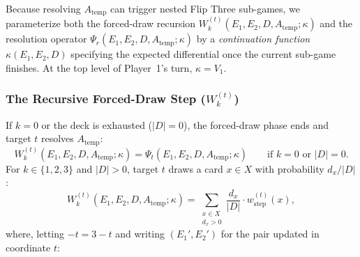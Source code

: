 \documentclass{article}
\theoremstyle{plain}
\theoremstyle{definition}
\theoremstyle{remark}
\begin{document}
Because resolving $A_{\text{temp}}$ can trigger nested Flip Three sub-games, we parameterize both the forced-draw recursion $W_k^{(t)}(E_1, E_2, D, A_{\text{temp}}; \kappa)$ and the resolution operator $\Psi_r(E_1, E_2, D, A_{\text{temp}}; \kappa)$ by a \textit{continuation function} $\kappa(E_1, E_2, D)$ specifying the expected differential once the current sub-game finishes. At the top level of Player~1's turn, $\kappa = V_1$.

\subsubsection{The Recursive Forced-Draw Step ($W_k^{(t)}$)}
If $k = 0$ or the deck is exhausted ($|D| = 0$), the forced-draw phase ends and target $t$ resolves $A_{\text{temp}}$:
\[
    W_k^{(t)}(E_1, E_2, D, A_{\text{temp}}; \kappa) = \Psi_t(E_1, E_2, D, A_{\text{temp}}; \kappa) \qquad \text{if } k = 0 \text{ or } |D| = 0.
\]
For $k \in \{1, 2, 3\}$ and $|D| > 0$, target $t$ draws a card $x \in X$ with probability $d_x / |D|$:
\[
    W_k^{(t)}(E_1, E_2, D, A_{\text{temp}}; \kappa) = \sum_{\substack{x \in X \\ d_x > 0}} \frac{d_x}{|D|} \cdot w_{\text{step}}^{(t)}(x),
\]
where, letting $-t = 3 - t$ and writing $(E_1', E_2')$ for the pair updated in coordinate $t$:
\end{document}
